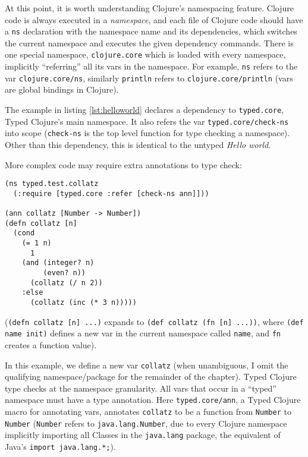 At this point, it is worth understanding Clojure's namespacing feature.
Clojure code is always executed in a \emph{namespace}, and each file of Clojure code should 
have a \lstinline|ns| declaration with the namespace name and its dependencies,
which switches the current namespace and executes the given dependency commands.
There is one special namespace, \lstinline|clojure.core| which is
loaded with every namespace, implicitly ``referring'' all its vars in the namespace.
For example, \lstinline|ns| refers to the var \lstinline|clojure.core/ns|,
similarly \lstinline|println| refers to \lstinline|clojure.core/println|
(vars are global bindings in Clojure).

The example in listing \ref{lst:helloworld} declares a dependency to 
\lstinline|typed.core|, Typed Clojure's main namespace. It also refers the var \lstinline|typed.core/check-ns|
into scope (\lstinline|check-ns| is the top level function for type checking a namespace).
Other than this dependency, this is identical to the untyped \emph{Hello world}.

More complex code may require extra annotations to type check:

\begin{lstlisting}[caption=Annotating vars in Typed Clojure (adapted from a Typed Scheme/Racket example by Tobin-Hochstadt~\cite{Tob10})]
(ns typed.test.collatz
  (:require [typed.core :refer [check-ns ann]]))

(ann collatz [Number -> Number])
(defn collatz [n]
  (cond
    (= 1 n) 
      1
    (and (integer? n) 
         (even? n)) 
      (collatz (/ n 2))
    :else 
      (collatz (inc (* 3 n)))))
\end{lstlisting}

(\lstinline|(defn collatz [n] ...)| expands to \lstinline|(def collatz (fn [n] ...))|,
where \lstinline|(def name init)| defines a new var in the current namespace 
called \lstinline|name|, and \lstinline|fn| creates a function value).

In this example, we define a new var \lstinline|collatz|
(when unambiguous, I omit the qualifying namespace/package for the remainder of the chapter).
Typed Clojure type checks at the namespace granularity. All vars that occur
in a ``typed'' namespace must have a type annotation. 
Here \lstinline|typed.core/ann|, a Typed Clojure macro for annotating vars, 
annotates \lstinline|collatz| to be a function from \lstinline|Number| to 
\lstinline|Number| (\lstinline|Number| refers to \lstinline|java.lang.Number|,
due to every Clojure namespace implicitly importing all Classes in the \lstinline|java.lang| package,
the equivalent of Java's \lstinline|import java.lang.*;|).

